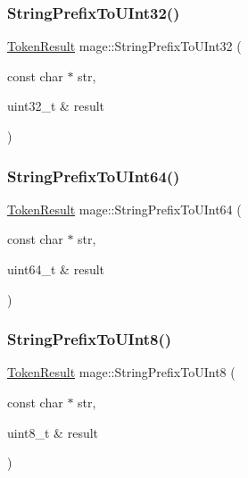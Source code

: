 \hypertarget{namespacemage_a7843190a71ad080e1ae5e5f1ca518db9}{}\label{namespacemage_a7843190a71ad080e1ae5e5f1ca518db9} 
\subsubsection{\texorpdfstring{String\+Prefix\+To\+U\+Int32()}{StringPrefixToUInt32()}}
{\footnotesize\ttfamily \hyperlink{namespacemage_a2178ba2411db5912f41b2e7698c2037d}{Token\+Result} mage\+::\+String\+Prefix\+To\+U\+Int32 (\begin{DoxyParamCaption}\item[{const char $\ast$}]{str,  }\item[{uint32\+\_\+t \&}]{result }\end{DoxyParamCaption})}

\hypertarget{namespacemage_ae0ffd357b75c2e9321dcf44c00f1b607}{}\label{namespacemage_ae0ffd357b75c2e9321dcf44c00f1b607} 
\subsubsection{\texorpdfstring{String\+Prefix\+To\+U\+Int64()}{StringPrefixToUInt64()}}
{\footnotesize\ttfamily \hyperlink{namespacemage_a2178ba2411db5912f41b2e7698c2037d}{Token\+Result} mage\+::\+String\+Prefix\+To\+U\+Int64 (\begin{DoxyParamCaption}\item[{const char $\ast$}]{str,  }\item[{uint64\+\_\+t \&}]{result }\end{DoxyParamCaption})}

\hypertarget{namespacemage_ace3c30c1b0e1eddafc8f14335223c46b}{}\label{namespacemage_ace3c30c1b0e1eddafc8f14335223c46b} 
\subsubsection{\texorpdfstring{String\+Prefix\+To\+U\+Int8()}{StringPrefixToUInt8()}}
{\footnotesize\ttfamily \hyperlink{namespacemage_a2178ba2411db5912f41b2e7698c2037d}{Token\+Result} mage\+::\+String\+Prefix\+To\+U\+Int8 (\begin{DoxyParamCaption}\item[{const char $\ast$}]{str,  }\item[{uint8\+\_\+t \&}]{result }\end{DoxyParamCaption})}

